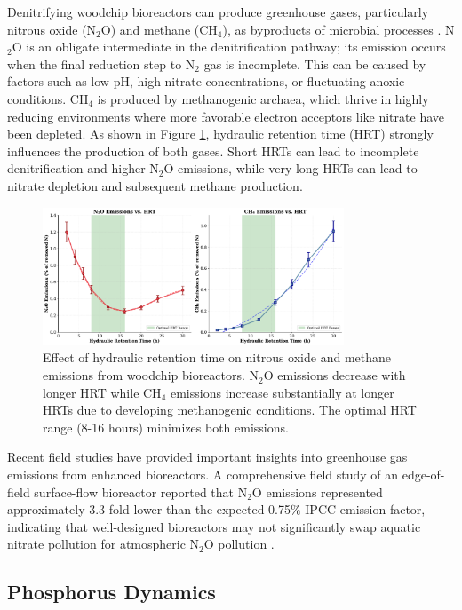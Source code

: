 \documentclass[12pt,a4paper]{article}
\begin{document}
Denitrifying woodchip bioreactors can produce greenhouse gases, particularly nitrous oxide (N$_{2}$O) and methane (CH$_{4}$), as byproducts of microbial processes \citep{RN1181, new_ref_4}. N$_{2}$O is an obligate intermediate in the denitrification pathway; its emission occurs when the final reduction step to N$_{2}$ gas is incomplete. This can be caused by factors such as low pH, high nitrate concentrations, or fluctuating anoxic conditions. CH$_{4}$ is produced by methanogenic archaea, which thrive in highly reducing environments where more favorable electron acceptors like nitrate have been depleted. As shown in Figure \ref{fig:greenhouse_gas}, hydraulic retention time (HRT) strongly influences the production of both gases. Short HRTs can lead to incomplete denitrification and higher N$_{2}$O emissions, while very long HRTs can lead to nitrate depletion and subsequent methane production.

\begin{figure}[ht]
\centering
\includegraphics[width=0.8\textwidth]{fig6_greenhouse_gas_scientific}
\caption{Effect of hydraulic retention time on nitrous oxide and methane emissions from woodchip bioreactors. N$_2$O emissions decrease with longer HRT while CH$_4$ emissions increase substantially at longer HRTs due to developing methanogenic conditions. The optimal HRT range (8-16 hours) minimizes both emissions.}
\label{fig:greenhouse_gas}
\end{figure}

Recent field studies have provided important insights into greenhouse gas emissions from enhanced bioreactors. A comprehensive field study of an edge-of-field surface-flow bioreactor reported that N$_{2}$O emissions represented approximately 3.3-fold lower than the expected 0.75\% IPCC emission factor, indicating that well-designed bioreactors may not significantly swap aquatic nitrate pollution for atmospheric N$_{2}$O pollution \citep{RN1181}.

\subsection{Phosphorus Dynamics}
\end{document}
